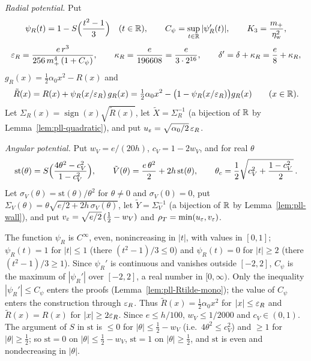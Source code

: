 \begin{construction}\label{cons:pll-morse}
\emph{Radial potential.} Put
\[
 \psi_R(t)=1-S\Bigl(\frac{t^2-1}{3}\Bigr)\quad(t\in\mathbb{R}),\qquad C_\psi=\sup_{t\in\mathbb{R}}|\psi_R'(t)|,\qquad
 K_3=\frac{m_+}{\eta_{\rm w}^2},
\]
\[
 \varepsilon_R=\frac{e\,r^3}{256\,m_+^4\,(1+C_\psi)},\qquad
 \kappa_R=\frac{e}{196608}=\frac{e}{3\cdot2^{16}},\qquad \delta'=\delta+\kappa_R=\frac e8+\kappa_R,
\]
$g_R(x)=\frac12\alpha_0x^2-R(x)$ and
\[
 \tilde R(x)=R(x)+\psi_R(x/\varepsilon_R)\,g_R(x)=\tfrac12\alpha_0x^2-\bigl(1-\psi_R(x/\varepsilon_R)\bigr)g_R(x)\qquad(x\in\mathbb{R}).
\]
Let $\Sigma_R(x)=\operatorname{sign}(x)\sqrt{\tilde R(x)}$, let $\tilde X=\Sigma_R^{-1}$ (a bijection of $\mathbb{R}$ by
Lemma~\ref{lem:pll-quadratic}), and put $u_\varepsilon=\sqrt{\alpha_0/2}\,\varepsilon_R$.

\emph{Angular potential.} Put $w_V=e/(20h)$, $c_V=1-2w_V$, and for real $\theta$
\[
 \mathrm{st}(\theta)=S\Bigl(\frac{4\theta^2-c_V^2}{1-c_V^2}\Bigr),\qquad
 \tilde V(\theta)=\frac{e\,\theta^2}{2}+2h\,\mathrm{st}(\theta),\qquad
 \theta_c=\frac12\sqrt{c_V^2+\frac{1-c_V^2}2}\, .
\]
Let $\sigma_V(\theta)=\mathrm{st}(\theta)/\theta^2$ for $\theta\ne0$ and $\sigma_V(0)=0$, put
$\Sigma_V(\theta)=\theta\sqrt{e/2+2h\,\sigma_V(\theta)}$, let $\tilde Y=\Sigma_V^{-1}$ (a bijection of $\mathbb{R}$ by
Lemma~\ref{lem:pll-wall}), and put $v_\varepsilon=\sqrt{e/2}\,(\frac12-w_V)$ and $\rho_T=\min(u_\varepsilon,v_\varepsilon)$.
\end{construction}

The function $\psi_R$ is $C^\infty$, even, nonincreasing in $|t|$, with values in $[0,1]$; $\psi_R(t)=1$ for
$|t|\le1$ (there $(t^2-1)/3\le0$) and $\psi_R(t)=0$ for $|t|\ge2$ (there $(t^2-1)/3\ge1$). Since $\psi_R'$ is
continuous and vanishes outside $[-2,2]$, $C_\psi$ is the maximum of $|\psi_R'|$ over $[-2,2]$, a real number in
$[0,\infty)$. Only the inequality $|\psi_R'|\le C_\psi$ enters the proofs (Lemma~\ref{lem:pll-Rtilde-mono}); the
value of $C_\psi$ enters the construction through $\varepsilon_R$. Thus $\tilde R(x)=\frac12\alpha_0x^2$ for
$|x|\le\varepsilon_R$ and $\tilde R(x)=R(x)$ for $|x|\ge2\varepsilon_R$. Since $e\le h/100$, $w_V\le1/2000$ and $c_V\in(0,1)$.
The argument of $S$ in $\mathrm{st}$ is $\le0$ for $|\theta|\le\frac12-w_V$ (i.e.\ $4\theta^2\le c_V^2$) and $\ge1$ for
$|\theta|\ge\frac12$; so $\mathrm{st}=0$ on $|\theta|\le\frac12-w_V$, $\mathrm{st}=1$ on $|\theta|\ge\frac12$, and
$\mathrm{st}$ is even and nondecreasing in $|\theta|$.


